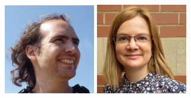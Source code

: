 \documentclass{beamer}
\begin{document}
\begin{frame}
\begin{columns}
\begin{column}{.2\textwidth}
\begin{center}
                \vspace{.2cm}
                \includegraphics[width=.8\textwidth]{img/fellows/david-perez-suarez_thumb.png}
                \vspace{.2cm}
                \includegraphics[width=.8\textwidth]{img/fellows/heather-ford_thumb.png}
            \end{center}
        \end{column}


\end{columns}
\end{frame}
\end{document}
